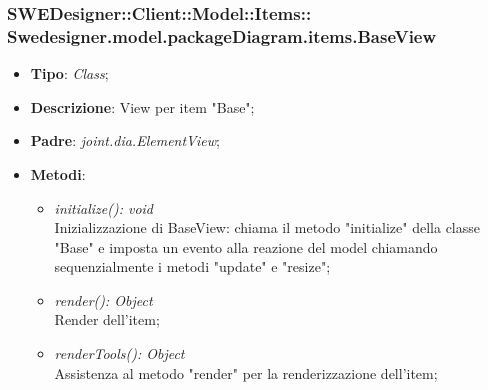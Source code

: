 \documentclass[../DefinizioneDiProdotto.tex]{subfiles}
\begin{document}
			
			\subsubsection[Swedesigner.model.packageDiagram.items.BaseView]{SWEDesigner::Client::Model::Items::\\Swedesigner.model.packageDiagram.items.BaseView}
			\hypertarget{SWEDesigner::Client::Model::Items::Swedesigner.model.packageDiagram.items.BaseView}{}
			\begin{itemize}
				\item \textbf{Tipo}: \emph{Class};
				\item \textbf{Descrizione}: View per item "Base";
				\item \textbf{Padre}: \emph{joint.dia.ElementView};
				\item \textbf{Metodi}:
				\begin{itemize}
					\item \emph{initialize(): void}\\
					Inizializzazione di BaseView: chiama il metodo "initialize" della classe "Base" e imposta un evento alla reazione del model chiamando sequenzialmente i metodi "update" e "resize";
					\item \emph{render(): Object}\\
					Render dell'item;
					\item \emph{renderTools(): Object}\\
					Assistenza al metodo "render" per la renderizzazione dell'item;
				\end{itemize}
			\end{itemize}
			
\end{document}
